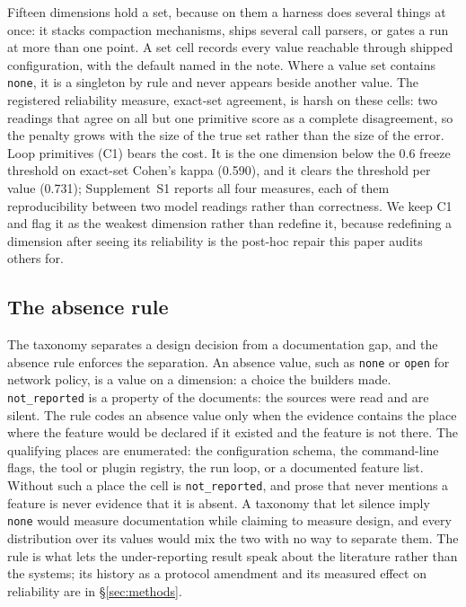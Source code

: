Fifteen dimensions hold a set, because on them a harness does several things at once: it stacks
compaction mechanisms, ships several call parsers, or gates a run at more than one point. A set cell
records every value reachable through shipped configuration, with the default named in the note. Where a value set contains \texttt{none}, it is a singleton by rule and never appears
beside another value. The registered reliability measure, exact-set agreement, is harsh on these cells:
two readings that agree on all but one primitive score as a complete disagreement, so the penalty grows
with the size of the true set rather than the size of the error. Loop primitives (C1) bears the cost. It
is the one dimension below the 0.6 freeze threshold on exact-set Cohen's kappa (0.590), and it clears
the threshold per value (0.731); Supplement~S1 reports all four measures, each of them
reproducibility between two model readings rather than correctness. We keep C1 and flag it as the
weakest dimension rather than redefine it, because redefining a dimension after seeing its reliability
is the post-hoc repair this paper audits others for.

\subsection{The absence rule}\label{subsec:absence}

The taxonomy separates a design decision from a documentation gap, and the absence rule enforces the
separation. An absence value, such as \texttt{none} or \texttt{open} for network policy, is a value on a
dimension: a choice the builders made. \texttt{not\_reported} is a property of the documents: the
sources were read and are silent. The rule codes an absence value only when the evidence contains the
place where the feature would be declared if it existed and the feature is not there. The qualifying
places are enumerated: the configuration schema, the command-line flags, the tool or plugin registry,
the run loop, or a documented feature list. Without such a place the cell is \texttt{not\_reported},
and prose that never mentions a feature is never evidence that it is absent. A taxonomy that let silence
imply \texttt{none} would measure documentation while claiming to measure design, and every
distribution over its values would mix the two with no way to separate them. The rule is what lets the
under-reporting result speak about the literature rather than the systems; its history as a protocol
amendment and its measured effect on reliability are in \S\ref{sec:methods}.

